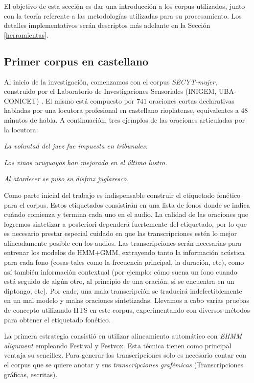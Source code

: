 El objetivo de esta sección es dar una introducción a los corpus utilizados, junto con la teoría referente a las metodologías utilizadas para su procesamiento. Los detalles implementativos serán descriptos más adelante en la Sección \ref{herramientas}.

\subsection{Primer corpus en castellano}

Al inicio de la investigación, comenzamos con el corpus \textit{SECYT-mujer}, construido por el Laboratorio de Investigaciones Sensoriales (INIGEM, UBA-CONICET) \cite{secytMujer}. El mismo está compuesto por $741$ oraciones cortas declarativas habladas por una locutora profesional en castellano rioplatense, equivalentes a $48$ minutos de habla. A continuación, tres ejemplos de las oraciones articuladas por la locutora:

\indent\indent \textit{La voluntad del juez fue impuesta en tribunales.}

\indent\indent \textit{Los vinos uruguayos han mejorado en el último lustro.}

\indent\indent \textit{Al atardecer se puso su disfraz juglaresco.}

Como parte inicial del trabajo es indispensable construir el etiquetado fonético para el corpus. Estos etiquetados consistirán en una lista de fonos donde se indica cuándo comienza y termina cada uno en el audio. La calidad de las oraciones que logremos sintetizar a posteriori dependerá fuertemente del etiquetado, por lo que es necesario prestar especial cuidado en que las transcripciones estén lo mejor alineadamente posible con los audios. Las transcripciones serán necesarias para entrenar los modelos de HMM+GMM, extrayendo tanto la información acústica para cada fono (cosas tales como la frecuencia principal, la duración, etc), como así también información contextual (por ejemplo: cómo suena un fono cuando está seguido de algún otro, al principio de una oración, si se encuentra en un diptongo, etc). Por ende, una mala transcripción se traducirá indefectiblemente en un mal modelo y malas oraciones sintetizadas. Llevamos a cabo varias pruebas de concepto utilizando HTS en este corpus, experimentando con diversos métodos para obtener el etiquetado fonético. 

La primera estrategia consistió en utilizar alineamiento automático con \textit{EHMM alignment} \cite{phoneticCapturing} empleando Festival y Festvox. Esta técnica tienen como principal ventaja su sencillez. Para generar las transcripciones solo es necesario contar con el corpus que se quiere anotar y sus \textit{transcripciones grafémicas} (Transcripciones gráficas, escritas).

